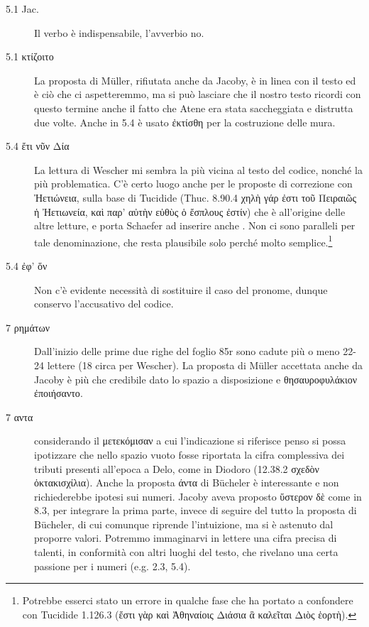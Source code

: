 \begin{description}
\item[5.1 Jac. \textgreek{}] Il verbo è indispensabile, l'avverbio no.
\item[5.1 \textgreek{κτίζοιτο}] La proposta di Müller, rifiutata anche da Jacoby, è in linea con il testo ed è ciò che ci aspetteremmo, ma si può lasciare che il nostro testo ricordi con questo termine anche il fatto che Atene era stata saccheggiata e distrutta due volte. Anche in 5.4 è usato \textgreek{ἐκτίσθη} per la costruzione delle mura.
\item[5.4 \textgreek{ἔτι νῦν Δία}]  La lettura di Wescher mi sembra la più vicina al testo del codice, nonché la più problematica. C'è certo luogo anche per le proposte di correzione con \textgreek{Ἠετιώνεια}, sulla base di Tucidide (Thuc. 8.90.4 \textgreek{χηλὴ γάρ ἐστι τοῦ Πειραιῶς ἡ Ἠετιωνεία, καὶ παρ’ αὐτὴν εὐθὺς ὁ ἔσπλους ἐστίν}) che è all'origine delle altre letture, e porta Schaefer ad inserire anche \textgreek{}. Non ci sono paralleli per tale denominazione, che resta plausibile solo perché molto semplice.\footnote{Potrebbe esserci stato un errore in qualche fase che ha portato a confondere con Tucidide 1.126.3 (\textgreek{ἔστι γὰρ καὶ Ἀθηναίοις Διάσια ἃ καλεῖται Διὸς ἑορτὴ}).}
\item[5.4 \textgreek{ἐφ’ ὅν}] Non c'è evidente necessità di sostituire il caso del pronome, dunque conservo l'accusativo del codice. 
\item[7 \textgreek{ρημάτων}] Dall'inizio delle prime due righe del foglio 85r sono cadute più o meno 22-24 lettere (18 circa per Wescher). La proposta di Müller accettata anche da Jacoby è più che credibile dato lo spazio a disposizione e \textgreek{θησαυροφυλάκιον ἐποιήσαντο}. 
\item[7 \textgreek{αντα}] considerando il \textgreek{μετεκόμισαν} a cui l'indicazione si riferisce penso si possa ipotizzare che nello spazio vuoto fosse riportata la cifra complessiva dei tributi presenti all'epoca a Delo, come in Diodoro (12.38.2 \textgreek{σχεδὸν ὀκτακισχίλια}). Anche la proposta \textgreek{άντα} di Bücheler è interessante e non richiederebbe ipotesi sui numeri. Jacoby aveva proposto \textgreek{ὕστερον δὲ} come in 8.3, per integrare la prima parte, invece di seguire del tutto la proposta di Bücheler, di cui comunque riprende l'intuizione, ma si è astenuto dal proporre valori. Potremmo immaginarvi in lettere una cifra precisa di talenti, in conformità con altri luoghi del testo, che rivelano una certa passione per i numeri (e.g. 2.3, 5.4).

\end{description}
